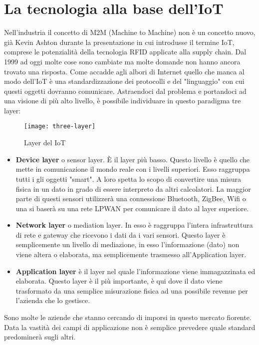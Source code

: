 \section{La tecnologia alla base dell'IoT} 
Nell'industria il concetto di M2M (Machine to Machine) non è un concetto
nuovo,
già Kevin Ashton durante la presentazione in cui introdusse il termine IoT,
comprese le potenzialità della tecnologia RFID applicate alla supply chain. Dal
1999 ad oggi molte cose sono cambiate ma molte domande non hanno ancora trovato
una risposta. Come accadde agli albori di Internet quello che manca al modo
dell'IoT è una standardizzazione dei protocolli e del "linguaggio" con cui questi
oggetti dovranno comunicare. Astraendoci dal problema e portandoci ad una visione
di più alto livello, è possibile individuare in questo paradigma
tre layer:
\begin{figure}[ht]
        \centering 
                \texttt{[image: three-layer]}
        \caption{Layer del IoT}
\end{figure}
\begin{itemize}
\item   \textbf{Device layer} o sensor layer. È il layer più basso. Questo 
        livello è quello che mette in comunicazione il
        mondo reale con i livelli superiori. Esso raggruppa
        tutti i gli oggetti "smart".  A loro spetta lo scopo di convertire
        una misura fisica in un dato in grado di essere  interpreto da altri calcolatori.
        La maggior parte di questi sensori utilizzerà una connessione Bluetooth,
        ZigBee, Wifi o una si baserà su una rete LPWAN per comunicare il dato al layer
        superiore.
\item \textbf{Network layer} o mediation layer. In esso è raggruppa l'intera infrastruttura
di rete e gateway che ricevono i dati da i vari sensori. Questo layer è
semplicemente un livello di mediazione, in esso l'informazione (dato) non viene
altera o elaborata, ma semplicemente trasmesso all'Application layer.
\item \textbf{Application layer} è il layer nel quale l'informazione viene
immagazzinata ed elaborata. Questo layer è il più importante, è qui dove il dato
viene trasformato da una semplice misurazione fisica ad una possibile revenue
per l'azienda che lo gestisce.%
\end{itemize}
Sono molte le aziende che stanno cercando di imporsi in questo
mercato fiorente. Data la vastità dei campi di applicazione non è semplice
prevedere quale standard predominerà sugli altri.
